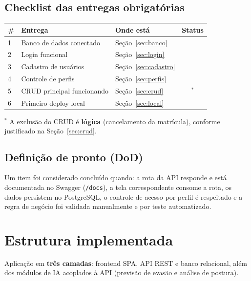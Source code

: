 \documentclass[11pt,a4paper,final]{article}
\newcommand{\ok}{\textcolor{verde}{\ding{51}}}
\newcommand{\cod}[1]{\texttt{#1}}
\begin{document}
\subsection{Checklist das entregas obrigatórias}

\begin{xltabular}{\textwidth}{l Y R{4.4cm} c}
  \toprule
  \textbf{\#} & \textbf{Entrega} & \textbf{Onde está} & \textbf{Status} \\
  \midrule
   & Banco de dados conectado      & Seção~\ref{sec:banco}   & \ok \\
  2 & Login funcional               & Seção~\ref{sec:login}   & \ok \\
  3 & Cadastro de usuários          & Seção~\ref{sec:cadastro} & \ok \\
  4 & Controle de perfis            & Seção~\ref{sec:perfis}  & \ok \\
  5 & CRUD principal funcionando    & Seção~\ref{sec:crud}    & \ok$^{*}$ \\
  6 & Primeiro deploy local         & Seção~\ref{sec:local}   & \ok \\
  \bottomrule
\end{xltabular}

{\small $^{*}$ A exclusão do CRUD é \textbf{lógica} (cancelamento da matrícula), conforme justificado na
Seção~\ref{sec:crud}.}

\subsection{Definição de pronto (DoD)}

Um item foi considerado concluído quando: a rota da API responde e está documentada no Swagger
(\cod{/docs}), a tela correspondente consome a rota, os dados persistem no PostgreSQL, o controle de
acesso por perfil é respeitado e a regra de negócio foi validada manualmente e por teste automatizado.

\section{Estrutura implementada}

Aplicação em \textbf{três camadas}: frontend SPA, API REST e banco relacional, além dos módulos de IA
acoplados à API (previsão de evasão e análise de postura).
\end{document}
